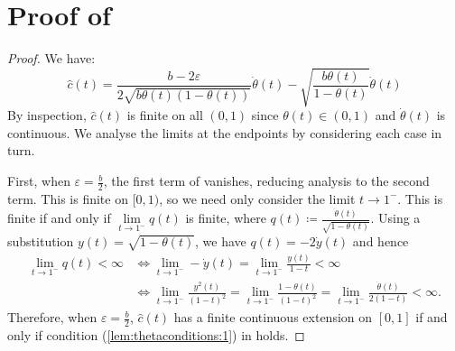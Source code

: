 \section{Proof of }\label{prf:lem:thetaconditions}
\restatelemthetaconditions*
\begin{proof}
  We have:
  \begin{equation}
    \hat{c}(t) = \frac{b - 2\varepsilon}{2 \sqrt{b \theta(t)(1-\theta(t))}} \dot{\theta}(t) - \sqrt{\frac{b \theta(t)}{1-\theta(t)}} \dot{\theta}(t) \label{eqn:chatme}
  \end{equation}
  By inspection, \(\hat{c}(t)\)  is finite on all \((0, 1)\) since \(\theta(t) \in (0, 1)\) and \(\dot{\theta}(t)\) is continuous. We analyse the limits at the endpoints by considering each case in turn.

  First, when \(\varepsilon = \frac{b}{2}\), the first term  of  vanishes, reducing analysis to the second term. This is finite on \([0, 1)\), so we need only consider the limit  \(t  \to 1^{-}\). This is finite if and only if \(\lim\limits_{t \to 1^{-}} q(t)\) is finite, where \(q(t) \coloneqq \frac{\dot{\theta}(t)}{\sqrt{1-\theta(t)}}\). Using a substitution \(y(t) = \sqrt{1-\theta(t)}\), we have \(q(t) = -2 \dot{y}(t)\) and hence
  \begin{align*}
    \lim\limits_{t \to 1^{-}} q(t) < \infty &\iff \lim\limits_{t \to 1^{-}} -\dot{y}(t) = \lim\limits_{t \to 1^{-}} \frac{y(t)}{1 - t} < \infty\\
    &\iff \lim\limits_{t \to 1^{-}} \frac{y^{2}(t)}{(1-t)^{2}}  = \lim\limits_{t \to 1^{-}} \frac{1-\theta(t)}{(1-t)^{2}} = \lim\limits_{t \to 1^{-}}  \frac{\dot{\theta}(t)}{2(1-t)} < \infty.
  \end{align*}
  Therefore, when \(\varepsilon = \frac{b}{2}\), \(\hat{c}(t)\) has a finite continuous extension on \([0, 1]\) if and only if condition (\ref{lem:thetaconditions:1}) in  holds.


\end{proof}
